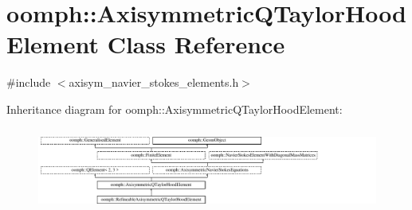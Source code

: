 \hypertarget{classoomph_1_1AxisymmetricQTaylorHoodElement}{}\section{oomph\+:\+:Axisymmetric\+Q\+Taylor\+Hood\+Element Class Reference}
\label{classoomph_1_1AxisymmetricQTaylorHoodElement}


{\ttfamily \#include $<$axisym\+\_\+navier\+\_\+stokes\+\_\+elements.\+h$>$}

Inheritance diagram for oomph\+:\+:Axisymmetric\+Q\+Taylor\+Hood\+Element\+:\begin{figure}[H]
\begin{center}
\leavevmode
\includegraphics[height=2.786069cm]{classoomph_1_1AxisymmetricQTaylorHoodElement}
\end{center}
\end{figure}
